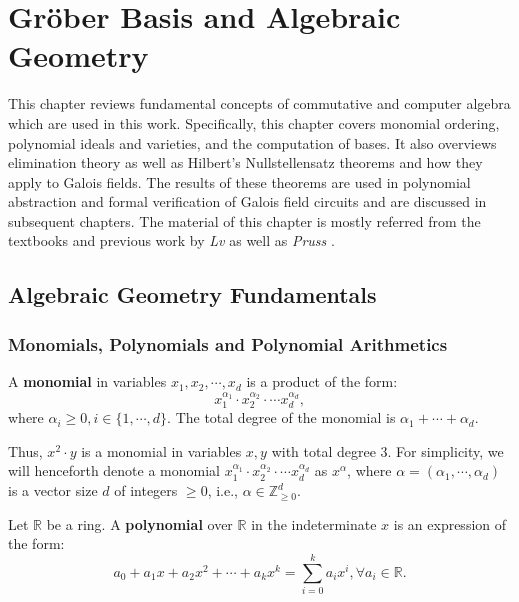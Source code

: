 \chapter{Gr\"ober Basis and Algebraic Geometry} \label{ch:ideals}
This chapter reviews fundamental concepts of commutative and 
computer algebra which are used in this work. 
Specifically, this chapter covers monomial ordering, polynomial ideals and 
varieties, and the computation of \Grobner bases.
It also overviews elimination theory as well as Hilbert's Nullstellensatz 
theorems and how
they apply to Galois fields. The results of these theorems are used in polynomial
abstraction and formal verification of Galois field circuits and 
are discussed 
in subsequent chapters. The material of this chapter is
mostly referred from the textbooks \cite{ideals:book} \cite{gb_book} and 
previous work by {\it Lv} \cite{lv:phd} as well as {\it Pruss} \cite{pruss:tcad15}.

\section{Algebraic Geometry Fundamentals}
\label{sec:geo}
\subsection{Monomials, Polynomials and Polynomial Arithmetics}
\begin{Definition} \label{def:mono}
A {\bf monomial} in variables $x_1,x_2,\cdots,x_d$ is a product of the form:
\begin{equation}
x_1^{{\alpha}_1} \cdot x_2^{{\alpha}_2} \cdot \cdots x_d^{{\alpha}_d},
\end{equation}
where $\alpha_i \ge 0, i\in\{1,\cdots,d\}$. 
The total degree of the monomial is $\alpha_{1}+\cdots+\alpha_{d}$.
\end{Definition} 

Thus, $x^2\cdot y$ is a monomial in variables $x,y$ with total degree $3$.
For simplicity, we will henceforth denote a 
monomial $x_1^{{\alpha}_1} \cdot x_2^
{{\alpha}_2} \cdot \cdots x_d^{{\alpha}_d}$ as $x^{\alpha}$, 
where $\alpha=({\alpha}_1,\cdots,{\alpha}_d)$ is a vector size $d$ of 
integers $\ge 0$, i.e., $\alpha \in \mathbb{Z}_{\ge 0}^{d}$.

\begin{Definition}\label{def:poly}
Let $\mathbb{R}$ be a ring. A {\bf polynomial} over $\mathbb{R}$ in the 
indeterminate $x$ is an expression of the form:
\begin{equation} \label{eq:poly1}
a_0 + a_1 x + a_2 x^2 + \cdots + a_k x^k = \sum_{i=0}^{k} a_i x^i, \forall a_i \in \mathbb{R}. 
\end{equation}

\end{Definition}

